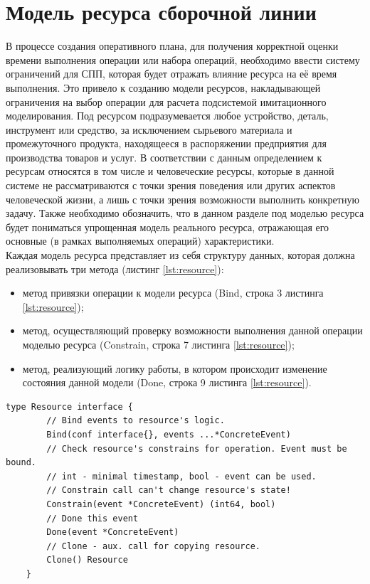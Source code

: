 \section{Модель ресурса сборочной линии}
\indent В процессе создания оперативного плана, для получения корректной оценки времени выполнения операции или набора операций, необходимо ввести систему ограничений для СПП, которая будет отражать влияние ресурса на её время выполнения.
Это привело к созданию модели ресурсов, накладывающей ограничения на выбор операции для расчета подсистемой имитационного моделирования.
Под ресурсом подразумевается любое устройство, деталь, инструмент или средство, за исключением сырьевого материала и промежуточного продукта, находящееся в распоряжении предприятия для производства товаров и услуг.
В соответствии с данным определением к ресурсам относятся в том числе и человеческие ресурсы, которые в данной системе не рассматриваются с точки зрения поведения или других аспектов человеческой жизни, а лишь с точки зрения возможности выполнить конкретную задачу.
Также необходимо обозначить, что в данном разделе под моделью ресурса будет пониматься упрощенная модель реального ресурса, отражающая его основные (в рамках выполняемых операций) характеристики.\\
\indent Каждая модель ресурса представляет из себя структуру данных, которая должна реализовывать три метода (листинг \ref{lst:resource}):
\begin{itemize}
	\item метод привязки операции к модели ресурса (Bind, строка 3 листинга \ref{lst:resource});
	\item метод, осуществляющий проверку возможности выполнения данной операции моделью ресурса (Constrain, строка 7 листинга \ref{lst:resource});
	\item метод, реализующий логику работы, в котором происходит изменение состояния данной модели (Done, строка 9 листинга \ref{lst:resource}).
\end{itemize}
\begin{lstlisting}[caption={Интерфейс ресурса},label={lst:resource},language=Golang]
	type Resource interface {
		// Bind events to resource's logic.
		Bind(conf interface{}, events ...*ConcreteEvent)
		// Check resource's constrains for operation. Event must be bound.
		// int - minimal timestamp, bool - event can be used.
		// Constrain call can't change resource's state!
		Constrain(event *ConcreteEvent) (int64, bool)
		// Done this event
		Done(event *ConcreteEvent)
		// Clone - aux. call for copying resource.
		Clone() Resource
	}
\end{lstlisting}

